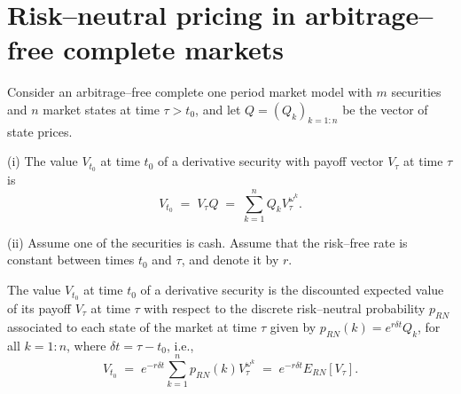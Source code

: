 
\section{Risk--neutral pricing in arbitrage--free complete markets}

\begin{theorem}
Consider an arbitrage--free complete one period market model with $m$
securities and $n$ market states at time $\tau > t_0$, and let $Q =
(Q_k)_{k=1:n}$ be the vector of state prices.

(i) The value $V_{t_0}$ at time $t_0$ of a derivative security with payoff
vector $V_\tau$ at time $\tau$ is
\begin{equation}
V_{t_0} \;=\; V_\tau Q \;=\; \sum_{k=1}^n Q_k V_\tau^{\omega^k}.
\end{equation}

(ii) Assume one of the securities is cash. Assume that the risk--free rate
is constant between times $t_0$ and $\tau$, and denote it by $r$.

The value $V_{t_0}$ at time $t_0$ of a derivative security is the
discounted expected value of its payoff $V_\tau$ at time $\tau$ with
respect to the discrete risk--neutral probability $p_{RN}$ associated to
each state of the market at time $\tau$ given by $p_{RN}(k) =
e^{r\delta t}Q_k$, for all $k = 1:n$, where $\delta t = \tau - t_0$, i.e.,
\begin{equation}
V_{t_0} \;=\; e^{-r\delta t}\sum_{k=1}^n p_{RN}(k)V_\tau^{\omega^k} \;=\;
e^{-r\delta t}E_{RN}\left[V_\tau\right].
\end{equation}
\end{theorem}

